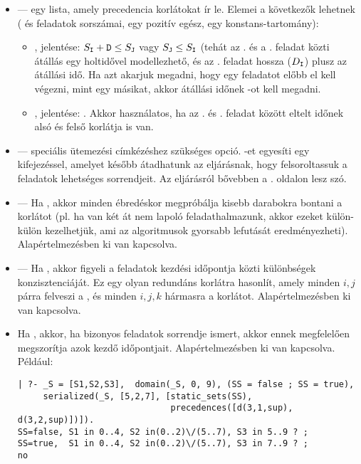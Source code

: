 \begin{itemize}
\item {} ---
           egy lista, amely precedencia korlátokat ír le. Elemei a következők
          lehetnek ( és  feladatok sorszámai,  egy pozitív
          egész,  egy  konstans-tartomány):  
\begin{itemize}
\item{}, jelentése: $S_{\texttt{I}}+\texttt{D} \leq S_{\texttt{J}}$ vagy $S_{\texttt{J}} \leq S_{\texttt{I}}$
(tehát az . és a . feladat közti átállás egy holtidővel modellezhető, és
 az . feladat hossza ($D_{\texttt{I}}$) plusz az átállási idő. Ha azt akarjuk
megadni, hogy egy feladatot előbb el kell végezni, mint egy másikat, akkor átállási
időnek -ot kell megadni.
\item{}, jelentése: . Akkor használatos, ha az . és . feladat között
eltelt időnek alsó és felső korlátja is van.
\end{itemize}

\item {} --- speciális ütemezési címkézéshez szükséges opció. -et
          egyesíti egy kifejezéssel, amelyet később átadhatunk az 
          eljárásnak, hogy felsoroltassuk a feladatok lehetséges sorrendjeit. Az
           eljárásról bővebben a \pageref{order_resource}. oldalon
          lesz szó.

\item {} ---
          Ha  , akkor minden ébredéskor megpróbálja
          kisebb darabokra bontani a korlátot (pl. ha van két
          át nem lapoló feladathalmazunk, akkor ezeket külön-külön
          kezelhetjük, ami az algoritmusok gyorsabb lefutását
          eredményezheti). Alapértelmezésben ki van kapcsolva.

\item {} ---
          Ha  , akkor figyeli a feladatok kezdési
          időpontja közti különbségek konzisztenciáját. Ez egy olyan redundáns
          korlátra hasonlít, amely minden $i,j$ párra felveszi a
          , és minden $i,j,k$ hármasra a
           korlátot. Alapértelmezésben
          ki van kapcsolva.

\item {}
          Ha  , akkor, ha bizonyos feladatok sorrendje
          ismert, akkor ennek megfelelően megszorítja azok kezdő
          időpontjait. Alapértelmezésben ki van kapcsolva. Például:
\begin{verbatim}
| ?- _S = [S1,S2,S3],  domain(_S, 0, 9), (SS = false ; SS = true),
     serialized(_S, [5,2,7], [static_sets(SS),
                              precedences([d(3,1,sup), d(3,2,sup)])]).
SS=false, S1 in 0..4, S2 in(0..2)\/(5..7), S3 in 5..9 ? ;
SS=true,  S1 in 0..4, S2 in(0..2)\/(5..7), S3 in 7..9 ? ;
no
\end{verbatim}


\end{itemize}
